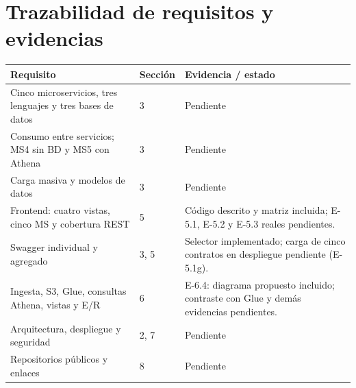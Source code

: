 \section{Trazabilidad de requisitos y evidencias}
\begin{longtable}{p{}p{}p{}}
\toprule
Requisito & Sección & Evidencia / estado \\
\midrule
\endhead
Cinco microservicios, tres lenguajes y tres bases de datos & 3 & Pendiente \\
Consumo entre servicios; MS4 sin BD y MS5 con Athena & 3 & Pendiente \\
Carga masiva y modelos de datos & 3 & Pendiente \\
Frontend: cuatro vistas, cinco MS y cobertura REST & 5 & Código descrito y matriz incluida; E-5.1, E-5.2 y E-5.3 reales pendientes. \\
Swagger individual y agregado & 3, 5 & Selector implementado; carga de cinco contratos en despliegue pendiente (E-5.1g). \\
Ingesta, S3, Glue, consultas Athena, vistas y E/R & 6 & E-6.4: diagrama propuesto incluido; contraste con Glue y demás evidencias pendientes. \\
Arquitectura, despliegue y seguridad & 2, 7 & Pendiente \\
Repositorios públicos y enlaces & 8 & Pendiente \\
\bottomrule
\end{longtable}
